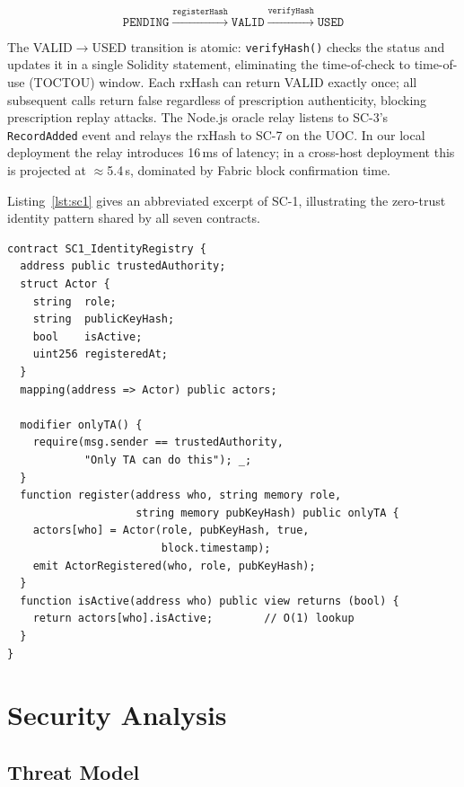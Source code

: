 \documentclass[sigplan,screen]{acmart}
\newcommand{\uoc}{UOC\xspace}
\begin{document}
\[
\texttt{PENDING} \xrightarrow{\texttt{registerHash}} \texttt{VALID}
\xrightarrow{\texttt{verifyHash}} \texttt{USED}
\]

The VALID$\to$USED transition is atomic: \texttt{verifyHash()} checks the
status and updates it in a single Solidity statement, eliminating the
time-of-check to time-of-use (TOCTOU) window.
Each rxHash can return VALID exactly once; all subsequent calls return
false regardless of prescription authenticity, blocking prescription
replay attacks.
The Node.js oracle relay listens to SC-3's \texttt{RecordAdded} event and
relays the rxHash to SC-7 on the \uoc.
In our local deployment the relay introduces 16\,ms of latency;
in a cross-host deployment this is projected at $\approx$5.4\,s,
dominated by Fabric block confirmation time.

Listing~\ref{lst:sc1} gives an abbreviated excerpt of SC-1, illustrating
the zero-trust identity pattern shared by all seven contracts.

\begin{lstlisting}[language=Solidity, caption={SC-1: Identity Registry
  (excerpt). Every other contract calls \texttt{isActive()} before accepting
  any transaction.}, label={lst:sc1}]
contract SC1_IdentityRegistry {
  address public trustedAuthority;
  struct Actor {
    string  role;
    string  publicKeyHash;
    bool    isActive;
    uint256 registeredAt;
  }
  mapping(address => Actor) public actors;

  modifier onlyTA() {
    require(msg.sender == trustedAuthority,
            "Only TA can do this"); _;
  }
  function register(address who, string memory role,
                    string memory pubKeyHash) public onlyTA {
    actors[who] = Actor(role, pubKeyHash, true,
                        block.timestamp);
    emit ActorRegistered(who, role, pubKeyHash);
  }
  function isActive(address who) public view returns (bool) {
    return actors[who].isActive;        // O(1) lookup
  }
}
\end{lstlisting}

\section{Security Analysis}\label{sec:security}

\subsection{Threat Model}
\end{document}
